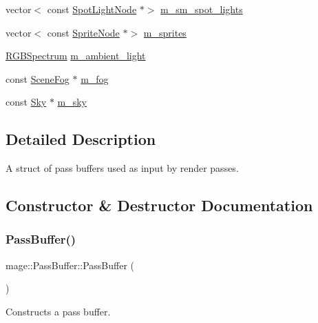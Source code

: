 \begin{DoxyCompactItemize}
\item 
vector$<$ const \hyperlink{namespacemage_aeed5dee4ff6c591eabb0e9114256df4a}{Spot\+Light\+Node} $\ast$$>$ \hyperlink{structmage_1_1_pass_buffer_aa28fb6d14ea463f82f35117e8dfa23fc}{m\+\_\+sm\+\_\+spot\+\_\+lights}
\item 
vector$<$ const \hyperlink{classmage_1_1_sprite_node}{Sprite\+Node} $\ast$$>$ \hyperlink{structmage_1_1_pass_buffer_ad742ad6712a63e9d58621da83a7fb900}{m\+\_\+sprites}
\item 
\hyperlink{structmage_1_1_r_g_b_spectrum}{R\+G\+B\+Spectrum} \hyperlink{structmage_1_1_pass_buffer_a311ad723470aff0ad80c325d9ead07b9}{m\+\_\+ambient\+\_\+light}
\item 
const \hyperlink{classmage_1_1_scene_fog}{Scene\+Fog} $\ast$ \hyperlink{structmage_1_1_pass_buffer_a3691cc52fe3bc5f1c86bf0dad36061d8}{m\+\_\+fog}
\item 
const \hyperlink{structmage_1_1_sky}{Sky} $\ast$ \hyperlink{structmage_1_1_pass_buffer_a19d0163dbfe7e60c664fdf433d47146b}{m\+\_\+sky}
\end{DoxyCompactItemize}


\subsection{Detailed Description}
A struct of pass buffers used as input by render passes. 

\subsection{Constructor \& Destructor Documentation}
\hypertarget{structmage_1_1_pass_buffer_a02e07a26327f6e57b193521636bb8e10}{}\label{structmage_1_1_pass_buffer_a02e07a26327f6e57b193521636bb8e10} 
\subsubsection{\texorpdfstring{Pass\+Buffer()}{PassBuffer()}\hspace{0.1cm}{\footnotesize\ttfamily [1/3]}}
{\footnotesize\ttfamily mage\+::\+Pass\+Buffer\+::\+Pass\+Buffer (\begin{DoxyParamCaption}{ }\end{DoxyParamCaption})}

Constructs a pass buffer. \hypertarget{structmage_1_1_pass_buffer_a1c6e779725227ebbb8e3d15a4515edbc}{}\label{structmage_1_1_pass_buffer_a1c6e779725227ebbb8e3d15a4515edbc} 
